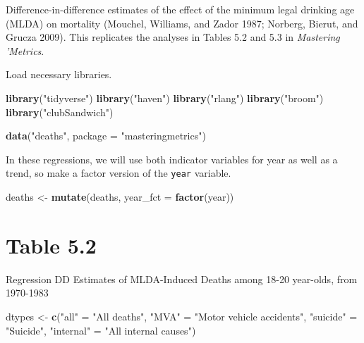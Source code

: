 \documentclass[]{book}
\newenvironment{Shaded}{\begin{snugshade}}{\end{snugshade}}
\newcommand{\KeywordTok}[1]{\textcolor[rgb]{0.13,0.29,0.53}{\textbf{#1}}}
\newcommand{\DataTypeTok}[1]{\textcolor[rgb]{0.13,0.29,0.53}{#1}}
\newcommand{\StringTok}[1]{\textcolor[rgb]{0.31,0.60,0.02}{#1}}
\newcommand{\NormalTok}[1]{#1}
\theoremstyle{definition}
\theoremstyle{definition}
\theoremstyle{definition}
\theoremstyle{remark}
\begin{document}
Difference-in-difference estimates of the effect of the minimum legal
drinking age (MLDA) on mortality (Mouchel, Williams, and Zador 1987;
Norberg, Bierut, and Grucza 2009). This replicates the analyses in
Tables 5.2 and 5.3 in \emph{Mastering 'Metrics}.

Load necessary libraries.

\begin{Shaded}
\begin{Highlighting}[]
\KeywordTok{library}\NormalTok{(}\StringTok{"tidyverse"}\NormalTok{)}
\KeywordTok{library}\NormalTok{(}\StringTok{"haven"}\NormalTok{)}
\KeywordTok{library}\NormalTok{(}\StringTok{"rlang"}\NormalTok{)}
\KeywordTok{library}\NormalTok{(}\StringTok{"broom"}\NormalTok{)}
\KeywordTok{library}\NormalTok{(}\StringTok{"clubSandwich"}\NormalTok{)}
\end{Highlighting}
\end{Shaded}

\begin{Shaded}
\begin{Highlighting}[]
\KeywordTok{data}\NormalTok{(}\StringTok{"deaths"}\NormalTok{, }\DataTypeTok{package =} \StringTok{"masteringmetrics"}\NormalTok{)}
\end{Highlighting}
\end{Shaded}

In these regressions, we will use both indicator variables for year as
well as a trend, so make a factor version of the \texttt{year} variable.

\begin{Shaded}
\begin{Highlighting}[]
\NormalTok{deaths <-}\StringTok{ }\KeywordTok{mutate}\NormalTok{(deaths, }\DataTypeTok{year_fct =} \KeywordTok{factor}\NormalTok{(year))}
\end{Highlighting}
\end{Shaded}

\section{Table 5.2}\label{table-5.2}

Regression DD Estimates of MLDA-Induced Deaths among 18-20 year-olds,
from 1970-1983

\begin{Shaded}
\begin{Highlighting}[]
\NormalTok{dtypes <-}\StringTok{ }\KeywordTok{c}\NormalTok{(}\StringTok{"all"}\NormalTok{ =}\StringTok{ "All deaths"}\NormalTok{,}
            \StringTok{"MVA"}\NormalTok{ =}\StringTok{ "Motor vehicle accidents"}\NormalTok{,}
            \StringTok{"suicide"}\NormalTok{ =}\StringTok{ "Suicide"}\NormalTok{,}
            \StringTok{"internal"}\NormalTok{ =}\StringTok{ "All internal causes"}\NormalTok{)}
\end{Highlighting}
\end{Shaded}
\end{document}

